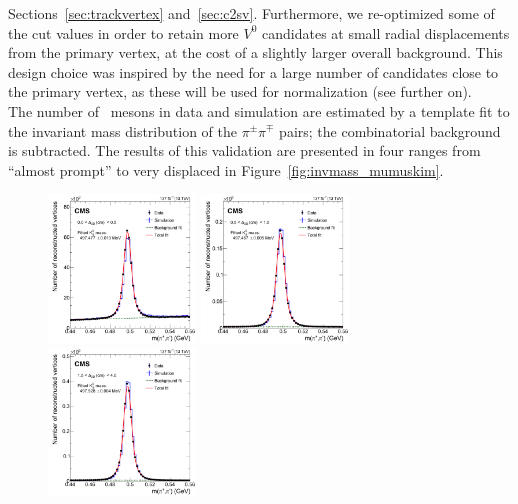 Sections~\ref{sec:trackvertex} and~\ref{sec:c2sv}.
Furthermore, we re-optimized some of the cut
values in order to retain more $V^0$ candidates at small radial
displacements from the primary vertex, at the cost of a slightly
larger overall background. This design choice was inspired by the need
for a large number of candidates close to the primary vertex, as these
will be used for normalization (see further on). \\
The number of \PKzS~mesons in data and simulation
are estimated by a template fit to the invariant mass distribution of the $\pi^{\pm}\pi^{\mp}$
pairs; the combinatorial background is subtracted. The results of this
validation are presented in four \Deltwod ranges
from ``almost prompt'' to very displaced in Figure~\ref{fig:invmass_mumuskim}.

\begin{figure}[h!]
    \centering
    \includegraphics[width=0.35\textwidth]{Figures/paper/ksinvmass_run2_fig_0.pdf}
    \includegraphics[width=0.35\textwidth]{Figures/paper/ksinvmass_run2_fig_1.pdf} \\
    \includegraphics[width=0.35\textwidth]{Figures/paper/ksinvmass_run2_fig_2.pdf}

\end{figure}
